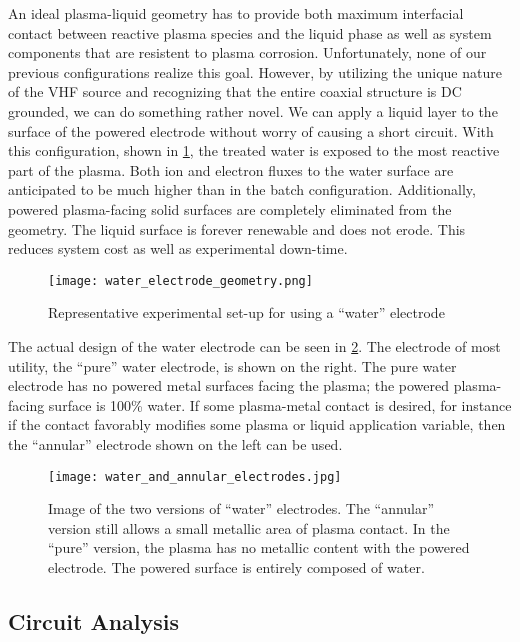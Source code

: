 An ideal plasma-liquid geometry has to provide both maximum interfacial contact between reactive plasma species and the liquid phase as well as system components that are resistent to plasma corrosion. Unfortunately, none of our previous configurations realize this goal. However, by utilizing the unique nature of the VHF source and recognizing that the entire coaxial structure is DC grounded, we can do something rather novel. We can apply a liquid layer to the surface of the powered electrode without worry of causing a short circuit. With this configuration, shown in \cref{fig:water_electrode_scheme}, the treated water is exposed to the most reactive part of the plasma. Both ion and electron fluxes to the water surface are anticipated to be much higher than in the batch configuration. Additionally, powered plasma-facing solid surfaces are completely eliminated from the geometry. The liquid surface is forever renewable and does not erode. This reduces system cost as well as experimental down-time.

\begin{figure}[htbp]
  \centering
  \texttt{[image: water\_electrode\_geometry.png]}
  \caption{Representative experimental set-up for using a ``water'' electrode}
  \label{fig:water_electrode_scheme}
\end{figure}

The actual design of the water electrode can be seen in \cref{fig:water_electrodes_image}. The electrode of most utility, the ``pure'' water electrode, is shown on the right. The pure water electrode has no powered metal surfaces facing the plasma; the powered plasma-facing surface is 100\% water. If some plasma-metal contact is desired, for instance if the contact favorably modifies some plasma or liquid application variable, then the ``annular'' electrode shown on the left can be used.

\begin{figure}[htbp]
  \centering
  \texttt{[image: water\_and\_annular\_electrodes.jpg]}
  \caption{Image of the two versions of ``water'' electrodes. The ``annular'' version still allows a small metallic area of plasma contact. In the ``pure'' version, the plasma has no metallic content with the powered electrode. The powered surface is entirely composed of water.}
  \label{fig:water_electrodes_image}
\end{figure}

\subsection{Circuit Analysis}
\label{sec:circuit}

